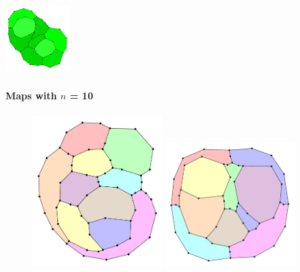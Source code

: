 \documentclass[t,18pt]{beamer}
\begin{document}
\begin{frame}[c]
  \includegraphics[width=2.5cm]{../Thesis/Resources/Evaluation-Example-Dynamics-AE097F3A-14FD-4735-A19B-8FD343CA3346-3-P.pdf}
\end{frame}

\begin{frame}
  \frametitle{}
  \framesubtitle{Maps with $n$ = 10}
  \begin{figure}
    \includegraphics[width=5cm]{../Thesis/Resources/Evaluation-Example-n10-0F69CDD9-EAAD-4F81-934F-8BA98B1424F6-2.pdf}
    \quad
    \includegraphics[width=5cm]{../Thesis/Resources/Evaluation-Example-n10-9A841901-DFA0-4ECD-A758-87E1C8A1D0D0-0.pdf}
  \end{figure}
\end{frame}
\end{document}
